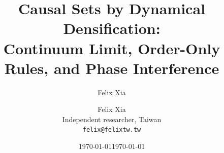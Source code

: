 \documentclass[aps,prd,preprint,superscriptaddress,nofootinbib,longbibliography]{revtex4-2}%
\def\usingrevtex{1}%
\begin{document}
\title{Causal Sets by Dynamical Densification:\\ Continuum Limit, Order-Only Rules, and Phase Interference}

\ifdefined\usingrevtex
  \author{Felix Xia}
  \date{\today}
  \begin{abstract}
  
  \end{abstract}
  \maketitle
\else
  \author{Felix Xia\\[2pt] {\small Independent researcher, Taiwan}\\ {\small\texttt{felix@felixtw.tw}}}
  \date{\today}
  \maketitle
  \begin{abstract}
  
  \end{abstract}
\fi





\end{document}
